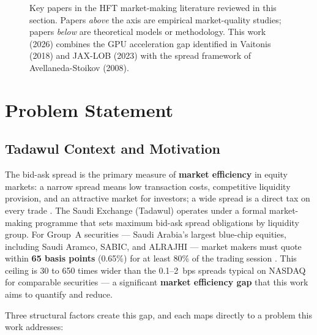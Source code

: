 \documentclass[12pt]{article}
\begin{document}
\begin{figure}[h]
\caption{Key papers in the HFT market-making literature reviewed in this
  section. Papers \textit{above} the axis are empirical market-quality
  studies; papers \textit{below} are theoretical models or methodology.
  This work (2026) combines the GPU acceleration gap identified in
  Vaitonis (2018) and JAX-LOB (2023) with the spread framework of
  Avellaneda-Stoikov (2008).}
\label{fig:lit_timeline}
\end{figure}

\newpage

\section{Problem Statement}
\label{sec:prob}

\subsection{Tadawul Context and Motivation}

The bid-ask spread is the primary measure of \textbf{market efficiency}
in equity markets: a narrow spread means low transaction costs, competitive
liquidity provision, and an attractive market for investors; a wide spread
is a direct tax on every trade \cite{harris2003}.
The Saudi Exchange (Tadawul) operates under a formal market-making
programme that sets maximum bid-ask spread obligations by liquidity group.
For Group~A securities --- Saudi Arabia's largest blue-chip equities,
including Saudi Aramco, SABIC, and ALRAJHI --- market makers must quote
within \textbf{65 basis points}
(0.65\%) for at least 80\% of the trading session \cite{tadawul2023}.
This ceiling is 30 to 650 times wider than the 0.1--2~bps spreads typical
on NASDAQ for comparable securities \cite{harris2003} --- a significant
\textbf{market efficiency gap} that this work aims to quantify and reduce.

Three structural factors create this gap, and each maps directly to a
problem this work addresses:
\end{document}
